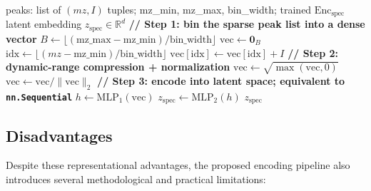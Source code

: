 \begin{algorithm}
    \caption{Spectrum to latent embedding: from (m/z, intensity) tuples to $z_{\mathrm{spec}}$}
    \label{alg:spectrum-to-latent}
    \begin{algorithmic}[1]
        \Require peaks: list of $(mz, I)$ tuples; mz\_min, mz\_max, bin\_width; trained $\mathrm{Enc}_{\mathrm{spec}}$
        \Ensure latent embedding $z_{\mathrm{spec}} \in \mathbb{R}^{d}$
        \Statex
        \State \textbf{// Step 1: bin the sparse peak list into a dense vector}
        \State $B \gets \lfloor (\text{mz\_max} - \text{mz\_min}) / \text{bin\_width} \rfloor$ 
        \State $\text{vec} \gets \mathbf{0}_{B}$
            \State $\text{idx} \gets \lfloor (mz - \text{mz\_min}) / \text{bin\_width} \rfloor$
                \State $\text{vec}[\text{idx}] \gets \text{vec}[\text{idx}] + I$ 
            \EndIf
        \EndFor
        \Statex
        \State \textbf{// Step 2: dynamic-range compression + normalization}
        \State $\text{vec} \gets \sqrt{\max(\text{vec}, 0)}$ 
            \State $\text{vec} \gets \text{vec} / \lVert \text{vec} \rVert_2$ 
        \EndIf
        \Statex
        \State \textbf{// Step 3: encode into latent space; equivalent to \texttt{nn.Sequential}}
        \State $h \gets \text{MLP}_1(\text{vec})$ 
        \State $z_{\mathrm{spec}} \gets \text{MLP}_2(h)$
        \State \Return $z_{\mathrm{spec}}$
    \end{algorithmic}
\end{algorithm}


\subsection{Disadvantages}
\label{sec:disadvantages}
Despite these representational advantages, the proposed encoding pipeline also introduces several methodological and practical limitations:

